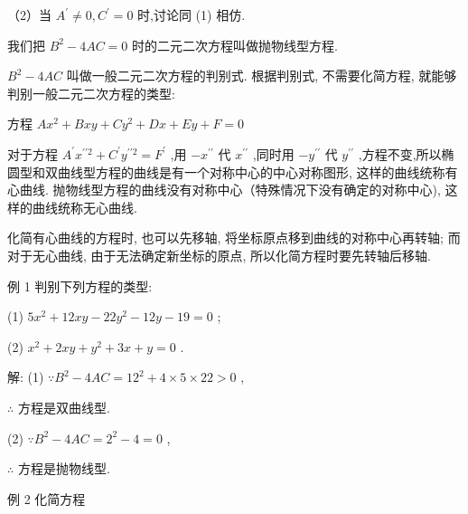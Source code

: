 \documentclass[lang=cn,newtx,10pt,scheme=chinese]{elegantbook}
\begin{document}
（2）当 \({A}^{\prime } \neq 0,{C}^{\prime } = 0\) 时,讨论同 (1) 相仿.

我们把 \({B}^{2} - {4AC} = 0\) 时的二元二次方程叫做抛物线型方程.

\({B}^{2} - {4AC}\) 叫做一般二元二次方程的判别式. 根据判别式, 不需要化简方程, 就能够判别一般二元二次方程的类型:

方程 \(A{x}^{2} + {Bxy} + C{y}^{2} + {Dx} + {Ey} + F = 0\)

\begin{center}
\end{center}

对于方程 \({A}^{\prime }{x}^{\prime \prime 2} + {C}^{\prime }{y}^{\prime \prime 2} = {F}^{\prime }\) ,用 \(- {x}^{\prime \prime }\) 代 \({x}^{\prime \prime }\) ,同时用 \(- {y}^{\prime \prime }\) 代 \({y}^{\prime \prime }\) ,方程不变,所以椭圆型和双曲线型方程的曲线是有一个对称中心的中心对称图形, 这样的曲线统称有心曲线. 抛物线型方程的曲线没有对称中心（特殊情况下没有确定的对称中心), 这样的曲线统称无心曲线.

化简有心曲线的方程时, 也可以先移轴, 将坐标原点移到曲线的对称中心再转轴; 而对于无心曲线, 由于无法确定新坐标的原点, 所以化简方程时要先转轴后移轴.

例 1 判别下列方程的类型:

(1) \(5{x}^{2} + {12xy} - {22}{y}^{2} - {12y} - {19} = 0\) ;

(2) \({x}^{2} + {2xy} + {y}^{2} + {3x} + y = 0\) .

解: (1) \(\because {B}^{2} - {4AC} = {12}^{2} + 4 \times 5 \times {22} > 0\) ,

\(\therefore\) 方程是双曲线型.

(2) \(\because {B}^{2} - {4AC} = {2}^{2} - 4 = 0\) ,

\(\therefore\) 方程是抛物线型.

例 2 化简方程
\end{document}
